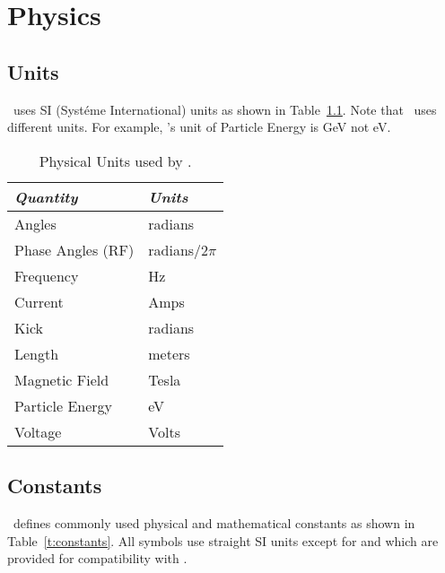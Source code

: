 \chapter{Physics}

\section{Units}
\label{s:units}

\bmad\ uses SI (Syst\'eme International) units as shown in
Table~\ref{t:units}.  Note that \mad\ uses different units. For example,
\mad's unit of Particle Energy is GeV not eV.
\begin{table}[h]
\centering
\begin{tabular}{|l|l|} \hline
  {\em Quantity}     & {\em Units}       \\ \hline
  Angles             &    radians        \\ 
  Phase Angles (RF)  &    radians/2$\pi$ \\ 
  Frequency          &    Hz             \\ 
  Current            &    Amps           \\ 
  Kick               &    radians        \\ 
  Length             &    meters         \\ 
  Magnetic Field     &    Tesla          \\ 
  Particle Energy    &    eV             \\ 
  Voltage            &    Volts          \\ \hline
\end{tabular}
\caption{Physical Units used by \bmad.}
\label{t:units}
\end{table}


\section{Constants}
\label{s:constants}

\bmad\ defines commonly used physical and mathematical constants as
shown in Table~\ref{t:constants}.  All symbols use straight SI units
except for  and  which are provided for
compatibility with \mad.

